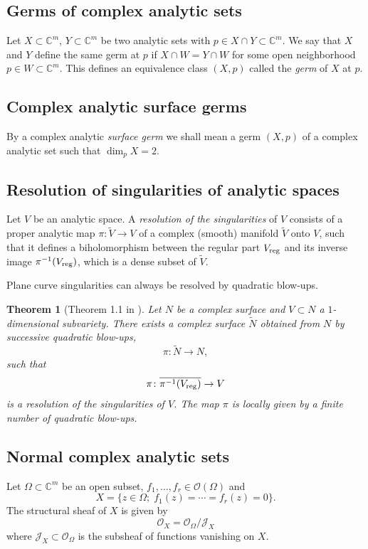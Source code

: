 \documentclass[11pt,twoside]{amsart}
\newcommand{\C}{\mathbb C}
\newcommand{\OO}{\mathcal O}
\newcommand{\J}{\mathcal J}
\newtheorem{teo}{Theorem}
\theoremstyle{definition}
\begin{document}
\subsection{Germs of complex analytic sets}

Let $X\subset\C^m$, $Y\subset\C^m$ be two analytic sets with $p\in X\cap Y\subset\C^m$. We say that $X$ and $Y$ define the same germ at $p$ if $X\cap W=Y\cap W$ for some open neighborhood $p\in W\subset\C^m$. This defines an equivalence class $(X,p)$ called the \textit{germ} of $X$ at $p$.

\subsection{Complex analytic surface germs}

By a complex analytic \textit{surface germ} we shall mean a germ $(X,p)$
of a complex analytic set such that $\dim_pX=2$.

\subsection{Resolution of singularities of analytic spaces}

Let $V$ be an analytic space. A \textit{resolution of the singularities} of $V$ consists of a proper analytic map $\pi\colon\widetilde V\to V$ of a complex (smooth) manifold $\widetilde V$ onto $V$, such that it defines a biholomorphism between the regular part $V_{\rm reg}$ and its inverse image $\pi^{-1}(V_{\rm reg})$, which is a dense subset of $\widetilde V$.

Plane curve singularities can always be resolved by quadratic blow-ups.

\begin{teo}[Theorem 1.1 in \cite{Laufer1971}]\normalfont
Let $N$ be a complex surface and $V\subset N$ a $1$-dimensional subvariety. There exists a complex surface $\widetilde N$ obtained from $N$ by successive quadratic blow-ups,
\[
\pi\colon\widetilde N\to N,
\]
such that
\[
\pi\colon\overline{\pi^{-1}(V_{\rm reg})}\to V
\]
is a resolution of the singularities of $V$. The map $\pi$ is locally given by a finite number of quadratic blow-ups.
\end{teo}

\subsection{Normal complex analytic sets}

Let $\Omega\subset\C^m$ be an open subset, $f_1,\ldots,f_r\in\OO(\Omega)$ and
\[
X=\{z\in\Omega;\; f_1(z)=\cdots=f_r(z)=0\}.
\]
The structural sheaf of $X$ is given by
\[
\OO_X=\OO_\Omega/\J_X
\]
where $\J_X\subset\OO_\Omega$ is the subsheaf of functions vanishing on $X$.
\end{document}
